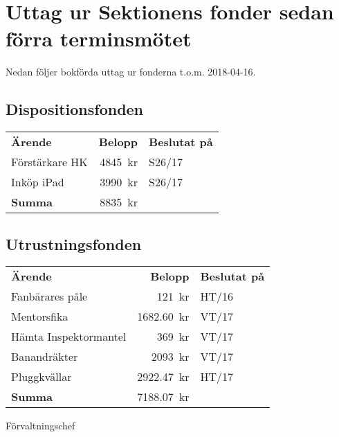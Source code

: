 \documentclass[../_main/handlingar.tex]{subfiles}
\begin{document}
\section{Uttag ur Sektionens fonder sedan förra terminsmötet}

Nedan följer bokförda uttag ur fonderna t.o.m. 2018-04-16.

\subsection*{Dispositionsfonden}
\begin{tabular}{l r l}
    \textbf{Ärende} & \textbf{Belopp} & \textbf{Beslutat på} \\
    Förstärkare HK & \SI{4845}{kr}   & S26/17   \\
    Inköp iPad     & \SI{3990}{kr}   & S26/17   \\ 
    \hline
    \textbf{Summa} & \SI{8835}{kr} \\   
\end{tabular}

\subsection*{Utrustningsfonden}
\begin{tabular}{l r l}
    \textbf{Ärende} & \textbf{Belopp} & \textbf{Beslutat på} \\
          
    Fanbärares påle & \SI{121}{kr} & HT/16 \\
    Mentorsfika & \SI{1682,60}{kr} & VT/17 \\
    Hämta Inspektormantel & \SI{369}{kr} & VT/17 \\
    Banandräkter & \SI{2093}{kr} & VT/17 \\
    Pluggkvällar & \SI{2922,47}{kr} & HT/17 \\ 
    \hline
    \textbf{Summa}        & \SI{7188,07}{kr} &                     
\end{tabular}


\begin{signatures}{1}
    \ist
    \signature{\fvc}{Förvaltningschef}
\end{signatures}
\end{document}
